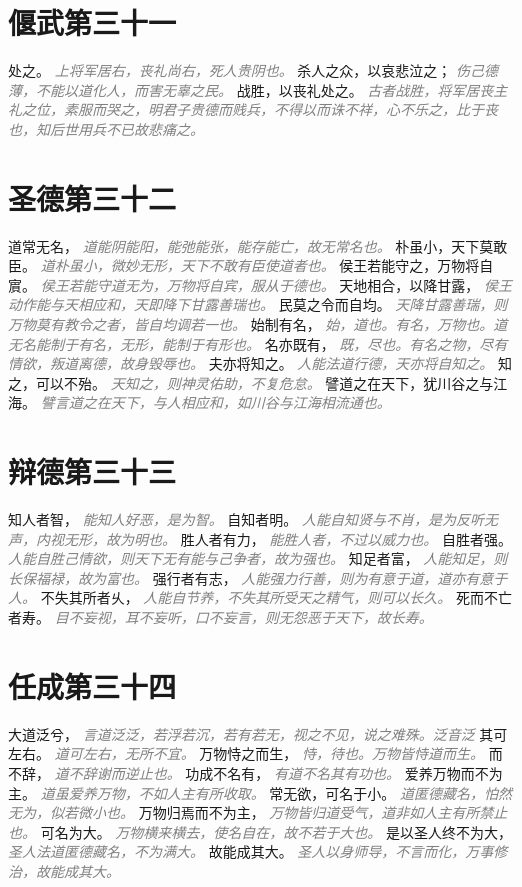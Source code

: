 \documentclass[a4paper,zihao=-4,oneside,landscape,UTF8]{ctexart}
\newcommand{\zhushi}[1]{\scriptsize{\textit{\textcolor{gray}{#1}}}\normalsize}
\begin{document}
\section{偃武第三十一}

处之。
\zhushi{上将军居右，丧礼尚右，死人贵阴也。}
杀人之众，以哀悲泣之；
\zhushi{伤己德薄，不能以道化人，而害无辜之民。}
战胜，以丧礼处之。
\zhushi{古者战胜，将军居丧主礼之位，素服而哭之，明君子贵德而贱兵，不得以而诛不祥，心不乐之，比于丧也，知后世用兵不已故悲痛之。}


\section{圣德第三十二}

道常无名，
\zhushi{道能阴能阳，能弛能张，能存能亡，故无常名也。}
朴虽小，天下莫敢臣。
\zhushi{道朴虽小，微妙无形，天下不敢有臣使道者也。}
侯王若能守之，万物将自賔。
\zhushi{侯王若能守道无为，万物将自宾，服从于德也。}
天地相合，以降甘露，
\zhushi{侯王动作能与天相应和，天即降下甘露善瑞也。}
民莫之令而自均。
\zhushi{天降甘露善瑞，则万物莫有教令之者，皆自均调若一也。}
始制有名，
\zhushi{始，道也。有名，万物也。道无名能制于有名，无形，能制于有形也。}
名亦既有，
\zhushi{既，尽也。有名之物，尽有情欲，叛道离德，故身毁辱也。}
夫亦将知之。
\zhushi{人能法道行德，天亦将自知之。}
知之，可以不殆。
\zhushi{天知之，则神灵佑助，不复危怠。}
譬道之在天下，犹川谷之与江海。
\zhushi{譬言道之在天下，与人相应和，如川谷与江海相流通也。}


\section{辩德第三十三}

知人者智，
\zhushi{能知人好恶，是为智。}
自知者明。
\zhushi{人能自知贤与不肖，是为反听无声，内视无形，故为明也。}
胜人者有力，
\zhushi{能胜人者，不过以威力也。}
自胜者强。
\zhushi{人能自胜己情欲，则天下无有能与己争者，故为强也。}
知足者富，
\zhushi{人能知足，则长保福禄，故为富也。}
强行者有志，
\zhushi{人能强力行善，则为有意于道，道亦有意于人。}
不失其所者乆，
\zhushi{人能自节养，不失其所受天之精气，则可以长久。}
死而不亡者寿。
\zhushi{目不妄视，耳不妄听，口不妄言，则无怨恶于天下，故长寿。}


\section{任成第三十四}

大道泛兮，
\zhushi{言道泛泛，若浮若沉，若有若无，视之不见，说之难殊。泛音泛}
其可左右。
\zhushi{道可左右，无所不宜。}
万物恃之而生，
\zhushi{恃，待也。万物皆恃道而生。}
而不辞，
\zhushi{道不辞谢而逆止也。}
功成不名有，
\zhushi{有道不名其有功也。}
爱养万物而不为主。
\zhushi{道虽爱养万物，不如人主有所收取。}
常无欲，可名于小。
\zhushi{道匿德藏名，怕然无为，似若微小也。}
万物归焉而不为主，
\zhushi{万物皆归道受气，道非如人主有所禁止也。}
可名为大。
\zhushi{万物横来横去，使名自在，故不若于大也。}
是以圣人终不为大，
\zhushi{圣人法道匿德藏名，不为满大。}
故能成其大。
\zhushi{圣人以身师导，不言而化，万事修治，故能成其大。}
\end{document}
